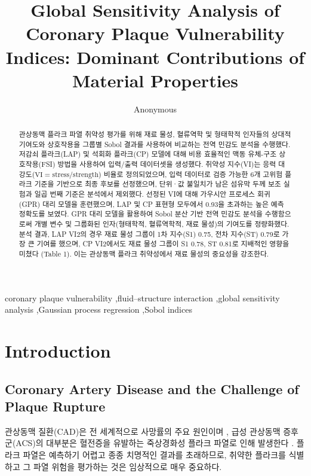 \documentclass[preprint,12pt]{elsarticle}
\begin{document}
\begin{frontmatter}
\title{Global Sensitivity Analysis of Coronary Plaque Vulnerability Indices: Dominant Contributions of Material Properties}
\author[label1]{Anonymous}
\begin{abstract}
관상동맥 플라크 파열 취약성 평가를 위해 재료 물성, 혈류역학 및 형태학적 인자들의 상대적 기여도와 상호작용을 그룹별 Sobol 결과를 사용하여 비교하는 전역 민감도 분석을 수행했다. 저감쇠 플라크(LAP) 및 석회화 플라크(CP) 모델에 대해 비용 효율적인 맥동 유체-구조 상호작용(FSI) 방법을 사용하여 입력/출력 데이터셋을 생성했다. 취약성 지수(VI)는 응력 대 강도($\text{VI} = \text{stress}/\text{strength}$) 비율로 정의되었으며, 입력 데이터로 검증 가능한 6개 고위험 플라크 기준을 기반으로 최종 후보를 선정했으며, 단위·값 불일치가 남은 섬유막 두께 보조 실험과 일곱 번째 기준은 분석에서 제외했다. 선정된 VI에 대해 가우시안 프로세스 회귀(GPR) 대리 모델을 훈련했으며, LAP 및 CP 표현형 모두에서 0.93을 초과하는 높은 예측 정확도를 보였다. GPR 대리 모델을 활용하여 Sobol 분산 기반 전역 민감도 분석을 수행함으로써 개별 변수 및 그룹화된 인자(형태학적, 혈류역학적, 재료 물성)의 기여도를 정량화했다. 분석 결과, LAP VI2의 경우 재료 물성 그룹이 1차 지수(S1) 0.75, 전차 지수(ST) 0.79로 가장 큰 기여를 했으며, CP VI2에서도 재료 물성 그룹이 S1 0.78, ST 0.81로 지배적인 영향을 미쳤다 (Table 1). 이는 관상동맥 플라크 취약성에서 재료 물성의 중요성을 강조한다.
\end{abstract}
\begin{keyword}
coronary plaque vulnerability \sep fluid–structure interaction \sep global sensitivity analysis \sep Gaussian process regression \sep Sobol indices
\end{keyword}
\end{frontmatter}

\section{Introduction}

\subsection{Coronary Artery Disease and the Challenge of Plaque Rupture}
관상동맥 질환(CAD)은 전 세계적으로 사망률의 주요 원인이며 \cite{roffi2015}, 급성 관상동맥 증후군(ACS)의 대부분은 혈전증을 유발하는 죽상경화성 플라크 파열로 인해 발생한다 \cite{stone2011}. 플라크 파열은 예측하기 어렵고 종종 치명적인 결과를 초래하므로, 취약한 플라크를 식별하고 그 파열 위험을 평가하는 것은 임상적으로 매우 중요하다.
\end{document}
